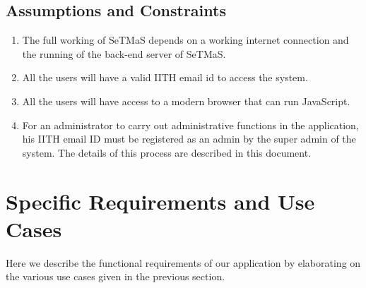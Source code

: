 \documentclass{article}
\begin{document}
\subsection{Assumptions and Constraints}
\begin{enumerate}
    \item The full working of SeTMaS depends on a working internet connection and the running of the back-end server of SeTMaS.
    \item All the users will have a valid IITH email id to access the system.
    \item All the users will have access to a modern browser that can run JavaScript. %
    \item For an administrator to carry out administrative functions in the application, his IITH email ID must be registered as an admin by the super admin of the system. The details of this process are described in this document.  
\end{enumerate}


\section{Specific Requirements and Use Cases}
 Here we describe the functional requirements of our application by elaborating on the various use cases given in the previous section. 
\end{document}
